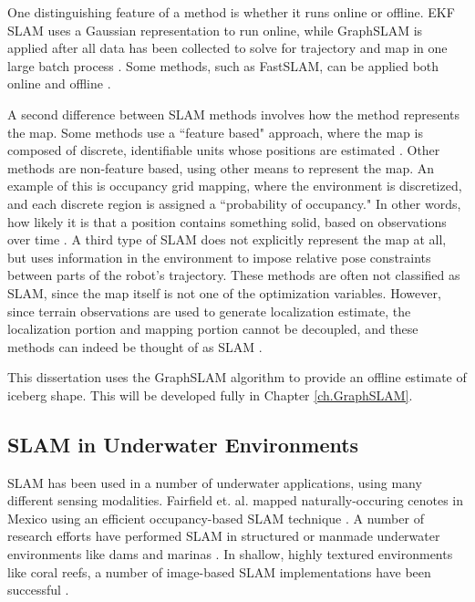 One distinguishing feature of a method is whether it runs online or offline. EKF SLAM uses a Gaussian representation to run online, while GraphSLAM is applied after all data has been collected to solve for trajectory and map in one large batch process \cite{Thrun2005}. Some methods, such as FastSLAM, can be applied both online and offline \cite{Montemerlo2002}.

A second difference between SLAM methods involves how the method represents the map. Some methods use a ``feature based" approach, where the map is composed of discrete, identifiable units whose positions are estimated \cite{Durrant2006}. Other methods are non-feature based, using other means to represent the map. An example of this is occupancy grid mapping, where the environment is discretized, and each discrete region is assigned a ``probability of occupancy." In other words, how likely it is that a position contains something solid, based on observations over time \cite{Fairfield2007}.  A third type of SLAM does not explicitly represent the map at all, but uses information in the environment to impose relative pose constraints between parts of the robot's trajectory. These methods are often not classified as SLAM, since the map itself is not one of the optimization variables. However, since terrain observations are used to generate localization estimate,  the localization portion and mapping portion cannot be decoupled, and these methods can indeed be thought of as SLAM \cite{Caress2008}. 

This dissertation uses the GraphSLAM algorithm \cite{Thrun2006} to provide an offline estimate of iceberg shape. This will be developed fully in Chapter \ref{ch.GraphSLAM}. 

\subsection{SLAM in Underwater Environments}

SLAM has been used in a number of underwater applications, using many different sensing modalities. Fairfield et. al. mapped naturally-occuring cenotes in Mexico using an efficient occupancy-based SLAM technique \cite{Fairfield2007}. A number of research efforts have performed SLAM in structured or manmade underwater environments like dams and marinas \cite{Ribas2008}. In shallow, highly textured environments like coral reefs, a number of image-based SLAM implementations have been successful \cite{Eustice2005}.

